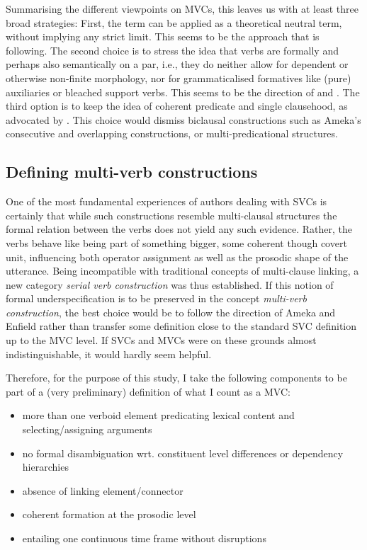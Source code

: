 Summarising the different viewpoints on MVCs, this leaves us with at least three broad strategies: First, the term can be applied as a theoretical neutral term, without implying any strict limit. This seems to be the approach that \citet{nordhoff2012} is following. The second choice is to stress the idea that verbs are formally and perhaps also semantically on a par, i.e., they do neither allow for dependent or otherwise non-finite morphology, nor for grammaticalised formatives like (pure) auxiliaries or bleached support verbs. This seems to be the direction of \citet{ameka2005multiverb, ameka2006ewe} and \citet{enfield2008verbs}. The third option is to keep the idea of coherent predicate and single clausehood, as advocated by \citet{Aikhenvald2011}. This choice would dismiss biclausal constructions such as Ameka's consecutive and overlapping constructions, or multi-predicational structures.

\subsection{Defining multi-verb constructions}\label{sec:defining}

One of the most fundamental experiences of authors dealing with SVCs is certainly that while such constructions resemble multi-clausal structures the formal relation between the verbs does not yield any such evidence. Rather, the verbs behave like being part of something bigger, some coherent though covert unit, influencing both operator assignment as well as the prosodic shape of the utterance. Being incompatible with traditional concepts of multi-clause linking, a new category \textit{serial verb construction} was thus established. If this notion of formal underspecification is to be preserved in the concept \textit{multi-verb construction}, the best choice would be to follow the direction of Ameka and Enfield rather than transfer some definition close to the standard SVC definition up to the MVC level. If SVCs and MVCs were on these grounds almost indistinguishable, it would hardly seem helpful.

Therefore, for the purpose of this study, I take the following components to be part of a (very preliminary) definition of what I count as a MVC:

\begin{itemize}
\item more than one verboid element predicating lexical content and selecting/as\-signing arguments
\item no formal disambiguation wrt. constituent level differences or dependency hierarchies
\item absence of linking element/connector
\item coherent formation at the prosodic level
\item entailing one continuous time frame without disruptions
\end{itemize} 

